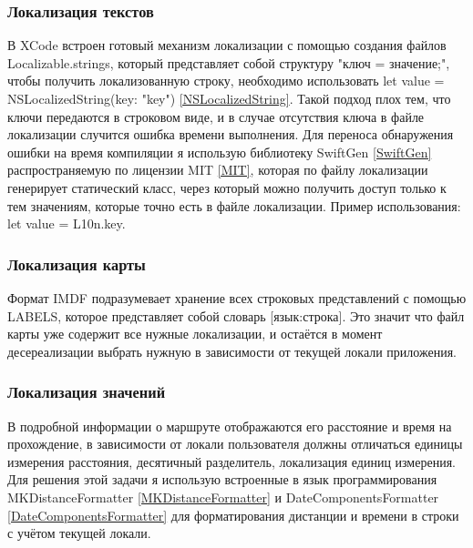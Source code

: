     \subsubsection{Локализация текстов}
      В XCode встроен готовый механизм локализации с помощью создания файлов Localizable.strings, который представляет собой структуру "ключ = значение;", чтобы получить локализованную строку, необходимо использовать let value = NSLocalizedString(key: "key") \ref{NSLocalizedString}. Такой подход плох тем, что ключи передаются в строковом виде, и в случае отсутствия ключа в файле локализации случится ошибка времени выполнения. Для переноса обнаружения ошибки на время компиляции я использую библиотеку SwiftGen \ref{SwiftGen} распространяемую по лицензии MIT \ref{MIT}, которая по файлу локализации генерирует статический класс, через который можно получить доступ только к тем значениям, которые точно есть в файле локализации. Пример использования: let value = L10n.key.

    \subsubsection{Локализация карты}
      Формат IMDF подразумевает хранение всех строковых представлений с помощью LABELS, которое представляет собой словарь [язык:строка]. Это значит что файл карты уже содержит все нужные локализации, и остаётся в момент десереализации выбрать нужную в зависимости от текущей локали приложения.

    \subsubsection{Локализация значений}
      В подробной информации о маршруте отображаются его расстояние и время на прохождение, в зависимости от локали пользователя должны отличаться единицы измерения расстояния, десятичный разделитель, локализация единиц измерения. Для решения этой задачи я использую встроенные в язык программирования MKDistanceFormatter \ref{MKDistanceFormatter} и DateComponentsFormatter \ref{DateComponentsFormatter} для форматирования дистанции и времени в строки с учётом текущей локали.

